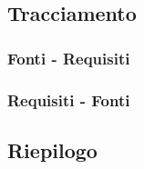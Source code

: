 \subsection{Tracciamento}

\subsubsection{Fonti - Requisiti}

\subsubsection{Requisiti - Fonti}

\subsection{Riepilogo}

